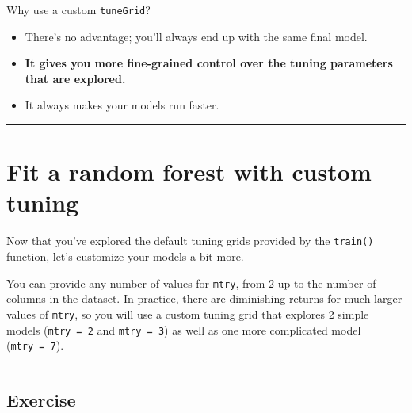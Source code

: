 \documentclass[]{book}
\begin{document}
Why use a custom \texttt{tuneGrid}?

\begin{itemize}
\item
  There's no advantage; you'll always end up with the same final model.
\item
  \textbf{It gives you more fine-grained control over the tuning
  parameters that are explored.}
\item
  It always makes your models run faster.
\end{itemize}

\begin{center}\rule{0.5\linewidth}{\linethickness}\end{center}

\section{Fit a random forest with custom
tuning}\label{fit-a-random-forest-with-custom-tuning}

Now that you've explored the default tuning grids provided by the
\texttt{train()} function, let's customize your models a bit more.

You can provide any number of values for \texttt{mtry}, from 2 up to the
number of columns in the dataset. In practice, there are diminishing
returns for much larger values of \texttt{mtry}, so you will use a
custom tuning grid that explores 2 simple models (\texttt{mtry\ =\ 2}
and \texttt{mtry\ =\ 3}) as well as one more complicated model
(\texttt{mtry\ =\ 7}).

\begin{center}\rule{0.5\linewidth}{\linethickness}\end{center}

\subsection*{Exercise}\label{exercise-19}
\end{document}
